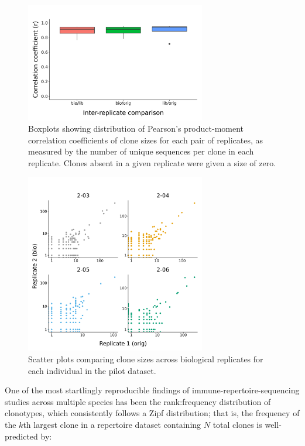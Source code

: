 \begin{figure}
\centering
\includegraphics[width = 0.7\textwidth]{_Figures/png/pilot-clone-sizes-cor-boxplots}
\caption{Boxplots showing distribution of Pearson's product-moment correlation coefficients of clone sizes for each pair of replicates, as measured by the number of unique sequences per clone in each replicate. Clones absent in a given replicate were given a size of zero.}
\label{fig:igseq-pilot-clone-sizes-cor-boxplots}
\end{figure}

\begin{figure}
\centering
\includegraphics[width = 0.7\textwidth]{_Figures/png/pilot-clone-sizes-cor-scatter}
\caption{Scatter plots comparing clone sizes across biological replicates for each individual in the pilot dataset.}
\label{fig:igseq-pilot-clone-sizes-cor-scatter}
\end{figure}

One of the most startlingly reproducible findings of immune-repertoire-sequencing studies across multiple species has been the rank:frequency distribution of clonotypes, which consistently follows a Zipf distribution; that is, the frequency of the $k$th largest clone in a repertoire dataset containing $N$ total clones is well-predicted by:

